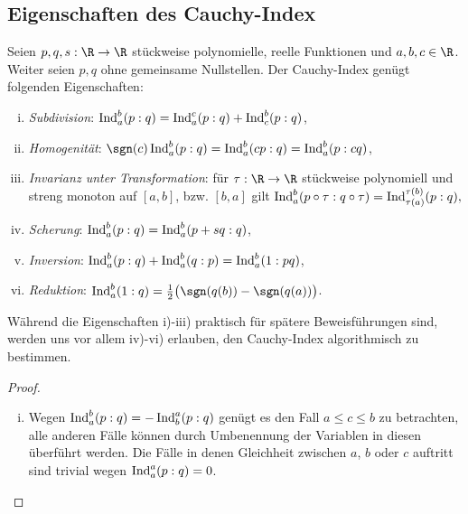 \documentclass{mythesis}
\begin{document}
\subsection{Eigenschaften des Cauchy-Index}

\begin{proposition}[Eigenschaften] \label{thm:cauchy-index_properties}
    Seien $p, q, s: \R \to \R$ stückweise polynomielle, reelle Funktionen und $a, b, c \in \R$.
    Weiter seien $p, q$ ohne gemeinsame Nullstellen.
    Der Cauchy-Index genügt folgenden Eigenschaften:
    \begin{enumerate}[i)]
        \item
            \emph{Subdivision}: $\operatorname{Ind}_a^b(p:q) = \operatorname{Ind}_a^c(p:q) + \operatorname{Ind}_c^b(p:q)$,
        \item
            \emph{Homogenität}: $\sgn(c) \Ind_a^b(p:q) = \Ind_a^b(cp:q) = \Ind_a^b(p:cq)$,
        \item
            \emph{Invarianz unter Transformation}: für $\tau: \R \to \R$ stückweise polynomiell und streng monoton auf $[a, b]$, bzw. $[b, a]$ gilt
            \begin{math}[numbered] \label{eq:cauchy-index_transformation}
                \Ind_a^b(p\circ\tau : q\circ\tau) = \Ind_{\tau(a)}^{\tau(b)}(p:q),
            \end{math}
        \item
            \emph{Scherung}: $\operatorname{Ind}_a^b(p:q) = \operatorname{Ind}_a^b(p + sq : q)$,
        \item
            \emph{Inversion}: $\operatorname{Ind}_a^b(p:q) + \operatorname{Ind}_a^b(q:p) = \operatorname{Ind}_a^b(1:pq)$,
        \item
            \emph{Reduktion}: $\Ind_a^b(1:q) = \frac{1}{2}\big(\sgn(q(b)) - \sgn(q(a))\big)$.
    \end{enumerate}
    \begin{note}
        Während die Eigenschaften i)-iii) praktisch für spätere Beweisführungen sind, werden uns vor allem iv)-vi) erlauben, den Cauchy-Index algorithmisch zu bestimmen.
    \end{note}
    \begin{proof}
        \begin{enumerate}[i)]
            \item
                Wegen $\operatorname{Ind}_a^b(p:q) = -\operatorname{Ind}_b^a(p:q)$ genügt es den Fall $a \le c \le b$ zu betrachten, alle anderen Fälle können durch Umbenennung der Variablen in diesen überführt werden.
                Die Fälle in denen Gleichheit zwischen $a$, $b$ oder $c$ auftritt sind trivial wegen $\operatorname{Ind}_a^a(p:q) = 0$.

\end{enumerate}
\end{proof}
\end{proposition}
\end{document}
